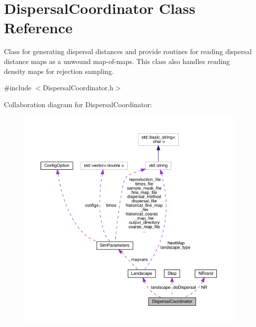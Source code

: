 \hypertarget{class_dispersal_coordinator}{}\section{Dispersal\+Coordinator Class Reference}
\label{class_dispersal_coordinator}


Class for generating dispersal distances and provide routines for reading dispersal distance maps as a unwound map-\/of-\/maps. This class also handles reading density maps for rejection sampling.  




{\ttfamily \#include $<$Dispersal\+Coordinator.\+h$>$}



Collaboration diagram for Dispersal\+Coordinator\+:
\nopagebreak
\begin{figure}[H]
\begin{center}
\leavevmode
\includegraphics[width=350pt]{class_dispersal_coordinator__coll__graph}
\end{center}
\end{figure}
